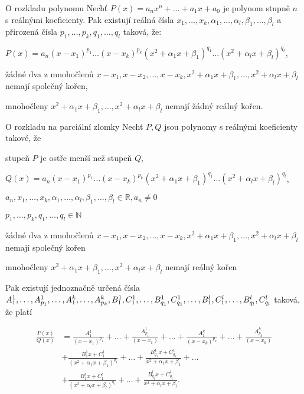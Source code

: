 \begin{vetaN}{O rozkladu polynomu}
Nechť $P(x)=a_nx^n +\dots+a_1x+a_0$ je polynom stupně $n$ s reálnými koeficienty. Pak existují reálná čísla $x_1,\dots,x_k,\alpha_1,\dots,\alpha_l,\beta_1,\dots,\beta_l$ a přirozená čísla $p_1,\dots,p_k,q_1,\dots,q_l$ taková, že:

\begin{penumerate}
	\item $P(x)=a_n(x-x_1)^{p_1} \dots (x-x_k)^{p_k}(x^2+\alpha_1x+\beta_1)^{q_1}\dots(x^2+\alpha_lx+\beta_l)^{q_l}$,
	\item žádné dva z mnohočlenů $x-x_1,x-x_2,\dots,x-x_k,x^2+\alpha_1x+\beta_1,\dots,x^2+\alpha_lx+\beta_l$ nemají společný kořen,
	\item mnohočleny $x^2+\alpha_1x+\beta_1,\dots,x^2+\alpha_lx+\beta_l$ nemají žádný reálný kořen.
\end{penumerate}
\end{vetaN}

\begin{vetaN}{O rozkladu na parciální zlomky}
Nechť $P,Q$ jsou polynomy s reálnými koeficienty takové, že

\begin{penumerate}
	\item stupeň $P$ je ostře menší než stupeň $Q$,
	\item $Q(x)=a_n(x-x_1)^{p_1}\dots(x-x_k)^{p_k} (x^2+\alpha_1x+\beta_1)^{q_1}\dots(x^2+\alpha_lx+\beta_l)^{q_l}$,
	\item $a_n,x_1,\dots,x_k,\alpha_1,\dots,\alpha_l,\beta_1,\dots,\beta_l \in \mathbb{R}, a_n \neq 0$
	\item $p_1,\dots,p_k,q_1,\dots,q_l \in \mathbb{N}$
	\item žádné dva z mnohočlenů $x-x_1, x-x_2,\dots,x-x_k,x^2+\alpha_1x+\beta_1,\dots,x^2+\alpha_lx+\beta_l$ nemají společný kořen
	\item mnohočleny $x^2+\alpha_1x+\beta_1, \dots, x^2+\alpha_lx+\beta_l$ nemají reálný kořen
\end{penumerate}

Pak existují jednoznačně určená čísla $A_1^1,\dots,A_{p_1}^{1},\dots,A_1^k,\dots,A_{p_k}^k,\\B_1^1,C_1^1,\dots,B_{q_1}^1,C_{q_1}^{1},\dots,B_1^l,C_1^l,\dots,B_{q_l}^l,C_{q_l}^l$ taková, že platí


\begin{align*}
\frac{P(x)}{Q(x)} & = \frac{A_1^1}{(x-x_1)^{p_1}} + \dots + \frac{A_{p_1}^1}{(x-x_1)} + \dots + \frac{A_1^k}{(x-x_k)^{p_k}} + \dots + \frac{A_{p_k}^k}{(x-x_k)}\\
&+ \frac{B_1^1x+C_1^1}{(x^2+\alpha_1x+\beta_1)^{q_1}} + \dots + \frac{B_{q_1}^1x+C_{q_1}^1}{x^2+\alpha_1x+\beta_1} + \dots\\
&+ \frac{B_1^lx+C_1^l}{(x^2+\alpha_lx+\beta_l)^{q_l}} + \dots + \frac{B_{q_l}^lx+C_{q_l}^l}{x^2+\alpha_lx+\beta_l}.
\end{align*}

\end{vetaN}

